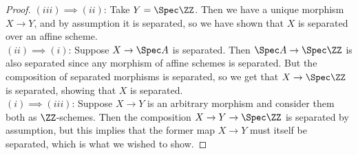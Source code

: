 \begin{proof}
	$(iii) \implies (ii)$: Take $Y = \Spec\ZZ$. Then we have a unique morphism $X \to Y$, and by assumption it is separated, so we have shown that $X$ is separated over an affine scheme. \\
	
	$(ii) \implies (i)$: Suppose $X \to \Spec A$ is separated. Then $\Spec A \to \Spec \ZZ$ is also separated since any morphism of affine schemes is separated. But the composition of separated morphisms is separated, so we get that $X \to \Spec \ZZ$ is separated, showing that $X$ is separated. \\
	
	$(i) \implies (iii)$: Suppose $X \to Y$ is an arbitrary morphism and consider them both as $\ZZ$-schemes. Then the composition $X \to Y \to \Spec \ZZ$ is separated by assumption, but this implies that the former map $X \to Y$ must itself be separated, which is what we wished to show.
\end{proof}
